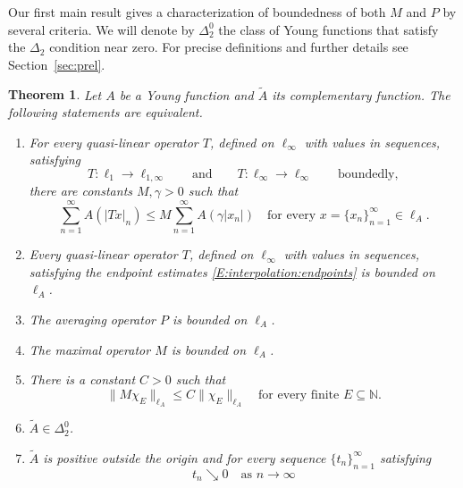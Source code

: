 \documentclass[nointlimits]{amsart}
\numberwithin{equation}{section}
\theoremstyle{plain}
\newtheorem{theorem}{Theorem}[section]
\theoremstyle{definition}
\newcommand{\N}{\mathbb{N}}
\newcommand{\DTwo}{\Delta_2}
\newcommand{\DTwoZ}{\DTwo^0}
\newcommand{\tA}{\tilde{A}}
\newcommand{\lA}{\ell_A}
\begin{document}
Our first main result gives a characterization of boundedness of both $M$ and $P$ by several criteria.
We will denote by $\DTwoZ$ the class of Young functions that satisfy the $\Delta_2$ condition near zero. For precise definitions and further details see Section~\ref{sec:prel}.


\begin{theorem}
    \label{T:main}
Let $A$ be a Young function and $\tA$ its complementary function. The following statements are equivalent.
\begin{enumerate}[(1)]
    \item\label{it:interpolation_modular} For every quasi-linear operator $T$, defined on $\ell_\infty$ with values in sequences, satisfying
    \begin{equation}\label{E:interpolation:endpoints}
        T\colon \ell_1 \to \ell_{1,\infty} \qquad\text{and}\qquad T\colon \ell_\infty \to \ell_\infty \qquad \text{boundedly},
    \end{equation}
    there are constants $M,\gamma>0$ such that
\begin{equation}\label{E:interpolation:modular}
    \sum_{n=1}^\infty A(|Tx|_n) \leq M \sum_{n=1}^\infty A(\gamma |x_n|) \quad \text{for every $x=\{x_n\}_{n=1}^\infty\in\lA$}.
\end{equation}
    \item\label{it:interpolation_norm} Every quasi-linear operator $T$, defined on $\ell_\infty$ with values in sequences, satisfying the endpoint estimates \eqref{E:interpolation:endpoints}
    is bounded on $\lA$.
    \item\label{it:average_bdd} The averaging operator $P$ is bounded on $\lA$.
    \item\label{it:maximal_bdd} The maximal operator $M$ is bounded on $\lA$.
    \item\label{it:maximal_bdd_restricted} There is a constant $C>0$ such that
    \begin{equation}\label{E:maximal_bdd_restricted}
        \|M\chi_E\|_{\lA} \leq C \|\chi_E\|_{\lA} \quad \text{for every finite $E\subseteq \N$}.
    \end{equation}
    \item\label{it:delta20} $\tA\in\DTwoZ$.
    \item\label{it:every_fund_seq} $\tA$ is positive outside the origin and for every sequence $\{t_n\}_{n=1}^\infty$ satisfying
    \begin{equation}\label{E1}
        t_n \searrow0 \quad \text{as $n\to\infty$}

\end{equation}
\end{enumerate}
\end{theorem}
\end{document}
